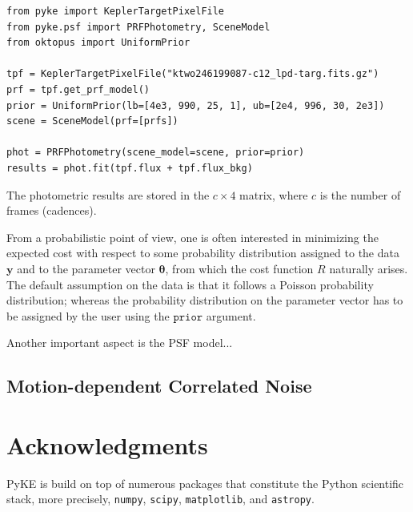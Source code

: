 \documentclass{article}
\begin{document}
\begin{verbatim}
from pyke import KeplerTargetPixelFile
from pyke.psf import PRFPhotometry, SceneModel
from oktopus import UniformPrior

tpf = KeplerTargetPixelFile("ktwo246199087-c12_lpd-targ.fits.gz")
prf = tpf.get_prf_model()
prior = UniformPrior(lb=[4e3, 990, 25, 1], ub=[2e4, 996, 30, 2e3])
scene = SceneModel(prf=[prfs])

phot = PRFPhotometry(scene_model=scene, prior=prior)
results = phot.fit(tpf.flux + tpf.flux_bkg)
\end{verbatim}

The photometric results are stored in the $c \times 4$ matrix, where $c$ is the
number of frames (cadences).

From a probabilistic point of view, one is often interested in minimizing the
expected cost with respect to some probability distribution assigned to the data
$\bm{y}$ and to the parameter vector $\bm{\theta}$, from which the cost function
$R$ naturally arises. The default assumption on the data is that it follows
a Poisson probability distribution; whereas the probability distribution on the
parameter vector has to be assigned by the user using the $\texttt{prior}$
argument.

Another important aspect is the PSF model...

\subsection{Motion-dependent Correlated Noise}
\label{subsection:motion}

\section{Acknowledgments}
PyKE is build on top of numerous packages that constitute the Python scientific
stack, more precisely, \texttt{numpy}, \texttt{scipy}, \texttt{matplotlib}, and
\texttt{astropy}.
\end{document}

